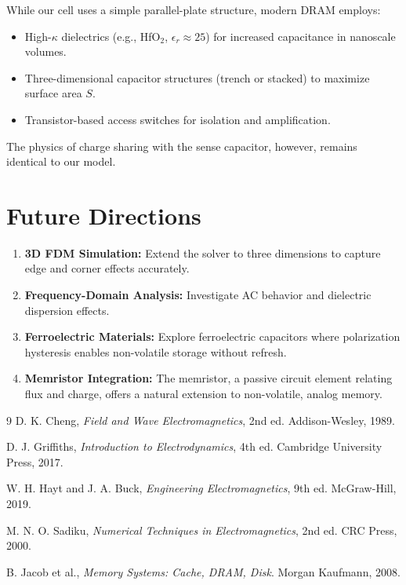 \documentclass[12pt,a4paper]{report}
\begin{document}
While our cell uses a simple parallel-plate structure, modern DRAM employs:
\begin{itemize}
    \item High-$\kappa$ dielectrics (e.g., HfO$_2$, $\epsilon_r \approx 25$) for increased capacitance in nanoscale volumes.
    \item Three-dimensional capacitor structures (trench or stacked) to maximize surface area $S$.
    \item Transistor-based access switches for isolation and amplification.
\end{itemize}

The physics of charge sharing with the sense capacitor, however, remains identical to our model.

\section{Future Directions}

\begin{enumerate}
    \item \textbf{3D FDM Simulation:} Extend the solver to three dimensions to capture edge and corner effects accurately.
    \item \textbf{Frequency-Domain Analysis:} Investigate AC behavior and dielectric dispersion effects.
    \item \textbf{Ferroelectric Materials:} Explore ferroelectric capacitors where polarization hysteresis enables non-volatile storage without refresh.
    \item \textbf{Memristor Integration:} The memristor, a passive circuit element relating flux and charge, offers a natural extension to non-volatile, analog memory.
\end{enumerate}

\begin{thebibliography}{9}
D. K. Cheng, \textit{Field and Wave Electromagnetics}, 2nd ed. Addison-Wesley, 1989.

D. J. Griffiths, \textit{Introduction to Electrodynamics}, 4th ed. Cambridge University Press, 2017.

W. H. Hayt and J. A. Buck, \textit{Engineering Electromagnetics}, 9th ed. McGraw-Hill, 2019.

M. N. O. Sadiku, \textit{Numerical Techniques in Electromagnetics}, 2nd ed. CRC Press, 2000.

B. Jacob et al., \textit{Memory Systems: Cache, DRAM, Disk}. Morgan Kaufmann, 2008.
\end{thebibliography}
\end{document}
